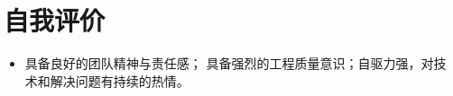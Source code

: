 \documentclass[letterpaper, UTF8, 11pt]{article}
\begin{document}
	\section*{\textbf{自我评价}}\vspace{-0.12in}
	\begin{itemize}	
		\item 具备良好的团队精神与责任感；
		具备强烈的工程质量意识；自驱力强，对技术和解决问题有持续的热情。
	\end{itemize}
	\vspace{-0.32in}
\end{document}
